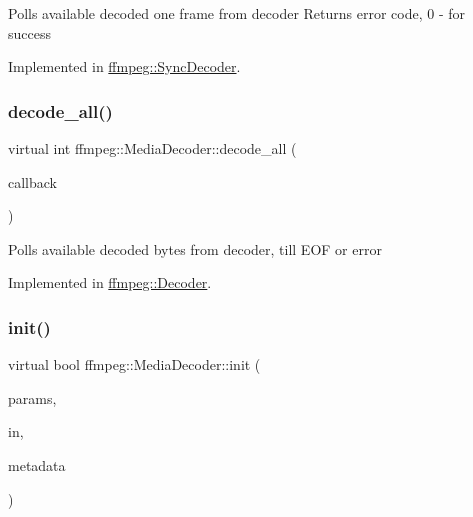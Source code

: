 Polls available decoded one frame from decoder Returns error code, 0 -\/ for success 

Implemented in \hyperlink{classffmpeg_1_1SyncDecoder_a61f546538c125ba3951a0f572eca49d1}{ffmpeg\+::\+Sync\+Decoder}.

\mbox{\label{classffmpeg_1_1MediaDecoder_acaf4668d2c876ede90eaa3a012b7146d}} 
\subsubsection{\texorpdfstring{decode\+\_\+all()}{decode\_all()}}
{\footnotesize\ttfamily virtual int ffmpeg\+::\+Media\+Decoder\+::decode\+\_\+all (\begin{DoxyParamCaption}\item[{const Decoder\+Out\+Callback \&}]{callback }\end{DoxyParamCaption})\hspace{0.3cm}{\ttfamily [pure virtual]}}

Polls available decoded bytes from decoder, till E\+OF or error 

Implemented in \hyperlink{classffmpeg_1_1Decoder_aceb0e1c21883ccd57c1692fccdd17745}{ffmpeg\+::\+Decoder}.

\mbox{\label{classffmpeg_1_1MediaDecoder_a1e65150d20d7540f8e35ce2d9f13017f}} 
\subsubsection{\texorpdfstring{init()}{init()}}
{\footnotesize\ttfamily virtual bool ffmpeg\+::\+Media\+Decoder\+::init (\begin{DoxyParamCaption}\item[{const \hyperlink{structffmpeg_1_1DecoderParameters}{Decoder\+Parameters} \&}]{params,  }\item[{Decoder\+In\+Callback \&\&}]{in,  }\item[{std\+::vector$<$ \hyperlink{structffmpeg_1_1DecoderMetadata}{Decoder\+Metadata} $>$ $\ast$}]{metadata }\end{DoxyParamCaption})\hspace{0.3cm}{\ttfamily [pure virtual]}}

